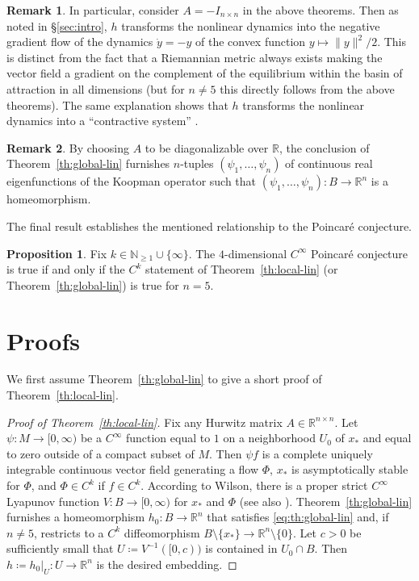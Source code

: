 \documentclass[11pt]{amsart}
\newcommand{\N}{\mathbb{N}}
\newcommand{\R}{\mathbb{R}}
\theoremstyle{definition}
\newtheorem{Prop}{Proposition}
\newtheorem{Rem}{Remark}
\begin{document}
\begin{Rem}\label{rem:gradient}
In particular, consider $A=-I_{n\times n}$ in the above theorems.
Then as noted in \S \ref{sec:intro}, $h$ transforms the nonlinear dynamics into the negative gradient flow of the dynamics $\dot{y}=-y$ of the convex function $y\mapsto \|y\|^2/2$.
This is distinct from the fact that a Riemannian metric always exists making the vector field a gradient on the complement of the equilibrium within the basin of attraction \cite[Thm~1]{barta2012lyapunov} in all dimensions (but for $n\neq 5$ this directly follows from the above theorems).
The same explanation shows that $h$ transforms the nonlinear dynamics into a ``contractive system'' \cite{sontag10yamamoto}.
\end{Rem}

\begin{Rem}\label{rem:eigenfunctions-independent}
By choosing $A$ to be diagonalizable over $\R$, the conclusion of Theorem~\ref{th:global-lin} furnishes $n$-tuples $(\psi_1,\ldots,\psi_n)$ of continuous real eigenfunctions of the Koopman operator such that $(\psi_1,\ldots,\psi_n)\colon B\to \R^n$ is a homeomorphism.
\end{Rem}

The final result establishes the mentioned relationship to the Poincar\'{e} conjecture.

\begin{Prop}\label{prop:poincare}
	Fix $k\in \N_{\geq 1}\cup \{\infty\}$.
	The $4$-dimensional $C^\infty$ Poincar\'{e} conjecture is true if and only if the $C^k$ statement of Theorem~\ref{th:local-lin} (or Theorem~\ref{th:global-lin}) is true for $n=5$.
\end{Prop}



\section{Proofs}\label{sec:proofs}

We first assume Theorem~\ref{th:global-lin} to give a short proof of Theorem~\ref{th:local-lin}.

\begin{proof}[Proof of Theorem~\ref{th:local-lin}]
	Fix any Hurwitz matrix $A\in \R^{n\times n}$.
	Let $\psi\colon M \to [0,\infty)$ be a $C^\infty$ function equal to $1$ on a neighborhood $U_0$ of $x_*$ and equal to zero outside of a compact subset of $M$.
	Then $\psi f$ is a complete uniquely integrable continuous vector field generating a flow $\Phi$,  $x_*$ is asymptotically stable for $\Phi$, and $\Phi\in C^k$ if $f\in C^k$.
	According to Wilson, there is a proper strict $C^\infty$ Lyapunov function $V\colon B\to [0,\infty)$ for $x_*$ and $\Phi$ \cite[Thm~3.2]{wilson1969smooth} (see also \cite[Sec.~6]{fathi2019smoothing}).
	Theorem~\ref{th:global-lin} furnishes a homeomorphism $h_0\colon B\to \R^n$ that satisfies \eqref{eq:th:global-lin} and, if $n\neq 5$, restricts to a $C^k$ diffeomorphism $B\setminus \{x_*\}\to \R^n\setminus \{0\}$.
	Let $c>0$ be sufficiently small that $U\coloneqq V^{-1}([0,c))$ is contained in $U_0\cap B$.
	Then $h\coloneqq h_0|_U\colon U\to \R^n$ is the desired embedding.
\end{proof}
\end{document}
